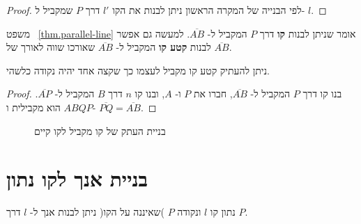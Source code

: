 \begin{proof}
לפי הבנייה של המקרה הראשון ניתן לבנות את הקו
$l'$
דרך 
$P$
שמקביל ל-%
$l$.
\end{proof}

משפט~%
\ref{thm.parallel-line}
אומר שניתן לבנות 
\textbf{קו}
דרך 
$P$
המקביל ל-%
$\overline{AB}$.
למעשה גם אפשר לבנות
\textbf{קטע קו}
המקביל ל-%
$\overline{AB}$
שאורכו שווה לאורך של
$\overline{AB}$.

\begin{theorem}
ניתן להעתיק קטע קו מקביל לעצמו כך שקצה אחד יהיה נקודה כלשהי.
\end{theorem}

\begin{proof}
בנו קו דרך
$P$
המקביל ל-%
$\overline{AB}$,
חברו את
$P$
ו-%
$A$,
ובנו קו
$n$
דרך 
$B$
המקביל ל-%
$\overline{AP}$.
$ABQP$
הוא מקבילית ו-%
$\overline{PQ}=\overline{AB}$.
\end{proof}

\begin{figure}[htb]
\begin{center}
\caption{בניית העתק של קו מקביל לקו קיים}\label{f.se-parallel-other4}
\end{center}
\end{figure}


\section{בניית אנך לקו נתון}\label{s.perpendicular}

\begin{theorem}\label{thm.perpendicular}
נתון קו
$l$
ונקודה
$P$
)שאיננה על הקו( ניתן לבנות אנך ל-%
$l$
דרך
$P$.%
\end{theorem}

